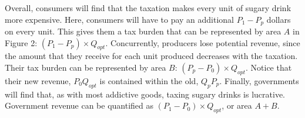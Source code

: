 \documentclass[12pt]{article}
\begin{document}
\vspace{\baselineskip}

Overall, consumers will find that the taxation makes every unit of sugary drink more expensive. Here, consumers will have to pay an additional $P_1 - P_p$ dollars on every unit. This gives them a tax burden that can be represented by area $A$ in Figure 2: $(P_1 - P_p) \times Q_{opt}$. Concurrently, producers lose potential revenue, since the amount that they receive for each unit produced decreases with the taxation. Their tax burden can be represented by area $B$: $(P_p - P_0) \times Q_{opt}$. Notice that their new revenue, $P_0Q_{opt}$ is contained within the old, $Q_pP_p$. Finally, governments will find that, as with most addictive goods, taxing sugary drinks is lucrative. Government revenue can be quantified as $(P_1 - P_0) \times Q_{opt}$, or area $A + B$. 
\end{document}
